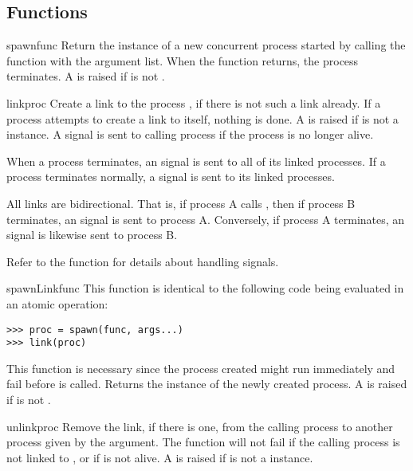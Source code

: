 \documentclass{howto}
\begin{document}
\subsection{Functions}

\begin{funcdesc}{spawn}{func}
Return the  instance of a new concurrent process started by
calling the function  with the  argument list. When the
function returns, the process terminates. A 
 is raised if  is not .
\end{funcdesc}

\begin{funcdesc}{link}{proc}
Create a link to the process , if there is not such a link already. If
a process attempts to create a link to itself, nothing is done. A
  is raised if  is not a
 instance. A   signal is sent to
calling process if the  process is no longer alive.

When a process terminates, an  signal is sent to all of its linked
processes. If a process terminates normally, a  
signal is sent to its linked processes.

All links are bidirectional. That is, if process A calls , then if
process B terminates, an  signal is sent to process A. Conversely,
if process A terminates, an  signal is likewise sent to process B.

Refer to the  function for details about handling
signals.
\end{funcdesc}

\begin{funcdesc}{spawnLink}{func}
This function is identical to the following code being evaluated in an atomic
operation:
\begin{verbatim}
>>> proc = spawn(func, args...)
>>> link(proc)
\end{verbatim}
This function is necessary since the process created might run immediately and
fail before  is called. Returns the  instance of
the newly created process. A   is raised if
 is not .
\end{funcdesc}

\begin{funcdesc}{unlink}{proc}
Remove the link, if there is one, from the calling process to another process
given by the  argument. The function will not fail if the calling
process is not linked to , or if  is not alive. A
  is raised if  is not a
 instance.
\end{funcdesc}
\end{document}
